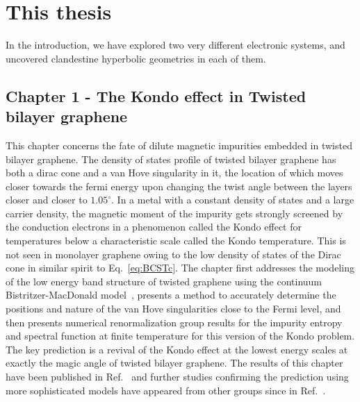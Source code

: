 \section{This thesis}
In the introduction, we have explored two very different electronic systems, and uncovered clandestine hyperbolic geometries in each of them.  

\subsection{Chapter 1 - The Kondo effect in Twisted bilayer graphene}
This chapter concerns the fate of dilute magnetic impurities embedded in twisted bilayer graphene. The density of states profile of twisted bilayer graphene has both a dirac cone and a van Hove singularity in it, the location of which moves closer towards the fermi energy upon changing the twist angle between the layers closer and closer to $1.05^\circ$. In a metal with a constant density of states and a large carrier density, the magnetic moment of the impurity gets strongly screened by the conduction electrons in a phenomenon called the Kondo effect for temperatures below a characteristic scale called the Kondo temperature. This is not seen in monolayer graphene owing to the low density of states of the Dirac cone in similar spirit to Eq.~\ref{eq:BCSTc}. The chapter first addresses the modeling of the low energy band structure of twisted graphene using the continuum Bistritzer-MacDonald model~\cite{Bistritzer2011}, presents a method to accurately determine the positions and nature of the van Hove singularities close to the Fermi level, and then presents numerical renormalization group results for the impurity entropy and spectral function at finite temperature for this version of the Kondo problem. The key prediction is a revival of the Kondo effect at the lowest energy scales at exactly the magic angle of twisted bilayer graphene. The results of this chapter have been published in Ref.~\cite{shankar2023kondo} and further studies confirming the prediction using more sophisticated models have appeared from other groups since in Ref.~\cite{chang2023vacancy}. 

